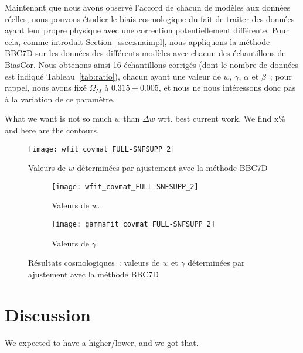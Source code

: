 \documentclass[../main/main.tex]{subfiles}
\begin{document}
Maintenant que nous avons observé l'accord de chacun de modèles aux données
réelles, nous pouvons étudier le biais cosmologique du fait de traiter des
données ayant leur propre physique avec une correction potentiellement
différente. Pour cela, comme introduit Section~\ref{ssec:snaimpl}, nous
appliquons la méthode BBC7D \citep[][voir Chapitre~\ref{ch:snana}
Section~\ref{ssec:bbc7D}]{popovic2021a} sur les données des différents modèles
avec chacun des échantillons de BiasCor. Nous obtenons ainsi 16 échantillons
corrigés (dont le nombre de données est indiqué Tableau~\ref{tab:ratio}), chacun
ayant une valeur de $w$, $\gamma$, $\alpha$ et $\beta$~; pour rappel, nous avons
fixé $\Omega_M$ à $\num{0.315}\pm\num{0.005}$, et nous ne nous intéressons donc
pas à la variation de ce paramètre.


What we want is not so much $w$ than $\Delta w$ wrt. best current work. We find
x\% and here are the contours.

\begin{figure}[ht]
    \centering
    \texttt{[image: wfit\_covmat\_FULL-SNFSUPP\_2]}
    \caption[]{Valeurs de $w$ déterminées par ajustement avec la méthode BBC7D
    }
    \label{fig:wfit}
\end{figure}

\begin{figure}[ht]
    \centering
    \begin{subfigure}[]{.48\linewidth}
        \centering
        \texttt{[image: wfit\_covmat\_FULL-SNFSUPP\_2]}
        \caption[Valeurs de $w$ avec le modèle de masse SNfsupp]{Valeurs de
        $w$.}
        \label{fig:cosmow}
    \end{subfigure}
    \hfill
    \begin{subfigure}[]{.48\linewidth}
        \centering
        \texttt{[image: gammafit\_covmat\_FULL-SNFSUPP\_2]}
        \caption[Valeurs de $\gamma$ avec le modèle de masse SNfsupp]{Valeurs de
        $\gamma$.}
        \label{fig:cosmow}
    \end{subfigure}
    \caption[Résultats cosmologiques~: $w$ et $\gamma$]{Résultats
        cosmologiques~: valeurs de $w$ et $\gamma$ déterminées par ajustement
        avec la méthode BBC7D }
    \label{fig:cosmo}
\end{figure}

\section{Discussion}\label{sec:simdisc}
We expected to have a higher/lower, and we got that.
\end{document}
